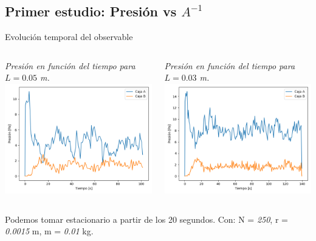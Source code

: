\documentclass{beamer}
\begin{document}
\subsection{Primer estudio: Presión vs $A^{-1}$}
\begin{frame}{Evolución temporal del observable}
  \begin{columns}
    \begin{column}{0.5\textwidth}
      \scriptsize \textit{Presión en función del tiempo para $L = 0.05$ m.}
      \includegraphics[width=\linewidth]{photoMaterial/pvt_05.png}
    \end{column}
    \begin{column}{0.5\textwidth}
      \scriptsize \textit{Presión en función del tiempo para $L = 0.03$ m.}
      \includegraphics[width=\linewidth]{photoMaterial/pvt_03.png}
    \end{column}
  \end{columns}
  \tiny Podemos tomar estacionario a partir de los 20 segundos.
  \tiny Con: N = \textit{250}, r = \textit{0.0015} m, m = \textit{0.01} kg.
\end{frame}
\end{document}
